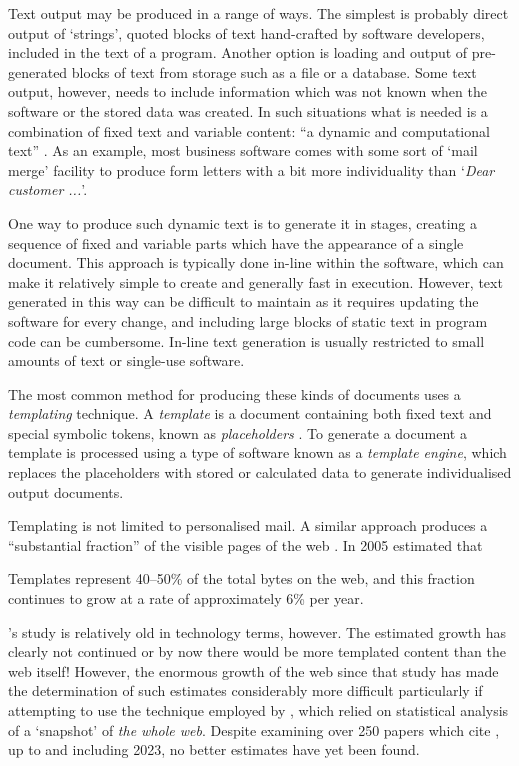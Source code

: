 Text output may be produced in a range of ways. The simplest is probably direct output of `strings', quoted blocks of text hand-crafted by software developers, included in the text of a program. Another option is loading and output of pre-generated blocks of text from storage such as a file or a database. Some text output, however, needs to include information which was not known when the software or the stored data was created. In such situations what is needed is a combination of fixed text and variable content: \enquote{a dynamic and computational text} \citep{Rodgers1999}. As an example, most business software comes with some sort of `mail merge' facility to produce form letters with a bit more individuality than `\emph{Dear customer ...}'.

One way to produce such dynamic text is to generate it in stages, creating a sequence of fixed and variable parts which have the appearance of a single document. This approach is typically done in-line within the software, which can make it relatively simple to create and generally fast in execution. However, text generated in this way can be difficult to maintain as it requires updating the software for every change, and including large blocks of static text in program code can be cumbersome. In-line text generation is usually restricted to small amounts of text or single-use software.

The most common method for producing these kinds of documents uses a \emph{templating} technique. A \emph{template} is a document containing both fixed text and special symbolic tokens, known as \emph{placeholders} \citep{Arnoldus2007}. To generate a document a template is processed using a type of software known as a \emph{template engine}, which replaces the placeholders with stored or calculated data to generate individualised output documents.

Templating is not limited to personalised mail. A similar approach produces a \enquote{substantial fraction} of the visible pages of the web \citep{Yang2008}. In 2005 \citeauthor{Gibson2005} estimated that

\begin{displayquote}
Templates represent 40–50\% of the total bytes on the web, and this fraction continues to grow at a rate of approximately 6\% per year.
\end{displayquote}

\citeauthor{Gibson2005}'s study is relatively old in technology terms, however. The estimated growth has clearly not continued or by now there would be more templated content than the web itself! However, the enormous growth of the web since that study has made the determination of such estimates considerably more difficult particularly if attempting to use the technique employed by \citeauthor{Gibson2005}, which relied on statistical analysis of a `snapshot' of \emph{the whole web}. Despite examining over 250 papers which cite \citeauthor{Gibson2005}, up to and including 2023, no better estimates have yet been found.


